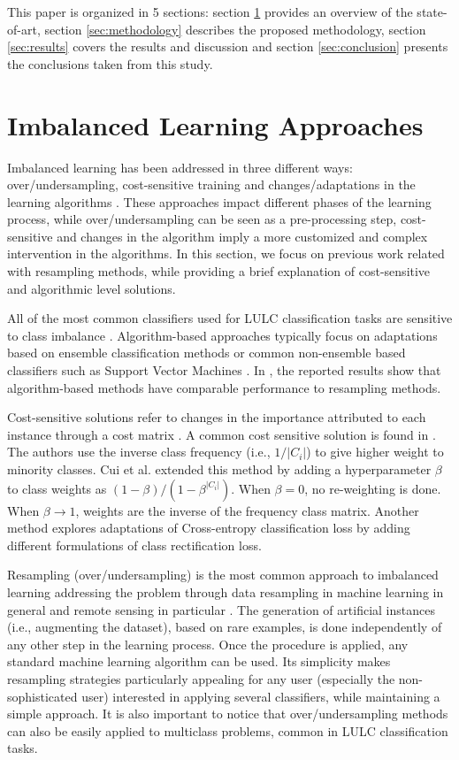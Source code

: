 \documentclass[parskip=full]{scrartcl}
\begin{document}
This paper is organized in 5 sections: section \ref{sec:sota} provides an
overview of the state-of-art, section \ref{sec:methodology} describes the
proposed methodology, section \ref{sec:results} covers the results and
discussion and section \ref{sec:conclusion} presents the conclusions taken from
this study.

\section{Imbalanced Learning Approaches} \label{sec:sota}

Imbalanced learning has been addressed in three different ways:
over/undersampling, cost-sensitive training and changes/adaptations in the
learning algorithms \cite{Kaur2019}. These approaches impact different
phases of the learning process, while over/undersampling can be seen as a
pre-processing step, cost-sensitive and changes in the algorithm imply a more
customized and complex intervention in the algorithms. In this
section, we focus on previous work related with resampling methods, while
providing a brief explanation of cost-sensitive and algorithmic level solutions.

All of the most common classifiers used for LULC classification tasks
\cite{Khatami2016, Gavade2019} are sensitive to class imbalance
\cite{Blagus2010}. Algorithm-based approaches typically focus on adaptations
based on ensemble classification methods \cite{Mellor2015} or common
non-ensemble based classifiers such as Support Vector Machines \cite{Shao2014}.
In \cite{Lee2016}, the reported results show that algorithm-based methods have
comparable performance to resampling methods.

Cost-sensitive solutions refer to changes in the importance attributed to each
instance through a cost matrix \cite{Huang2016,Cui2019,Dong2017}. A common cost
sensitive solution is found in \cite{Huang2016}. The authors use the inverse
class frequency (i.e., $1/|C_i|$) to give higher weight to minority classes. Cui
et al. \cite{Cui2019} extended this method by adding a hyperparameter $\beta$ to
class weights as $(1-\beta)/(1-\beta^{|C_i|})$. When $\beta=0$, no re-weighting
is done. When $\beta\rightarrow 1$, weights are the inverse of the frequency
class matrix. Another method \cite{Dong2017} explores adaptations of
Cross-entropy classification loss by adding different formulations of class
rectification loss.

Resampling (over/undersampling) is the most common approach to imbalanced
learning addressing the problem through data resampling in machine learning in
general and remote sensing in particular \cite{Feng2019}. The generation of
artificial instances (i.e., augmenting the dataset), based on rare examples,
is done independently of any other step in the learning process. Once the
procedure is applied, any standard machine learning algorithm can be used. Its
simplicity makes resampling strategies particularly appealing for any user
(especially the non-sophisticated user) interested in applying several
classifiers, while maintaining a simple approach.  It is also important to
notice that over/undersampling methods can also be easily applied to
multiclass problems, common in LULC classification tasks.
\end{document}
